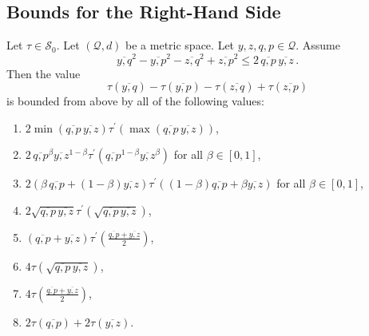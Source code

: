\documentclass{article}
\newcommand{\lb}{\left(} %
\newcommand{\rb}{\right)} %
\newcommand{\br}[1]{\lb #1 \rb} %
\newcommand{\brOf}[1]{\!\br{#1}} %
\newcommand*{\mc}[1]{\mathcal{#1}}
\newcommand{\pr}{^\prime}
\newcommand{\equationFullstop}{\, .}
\newcommand{\eqfs}{\equationFullstop}
\newcommand{\ol}[2]{\overline{#1,#2}}
\newcommand{\tran}{\tau}
\newcommand{\dtran}{\tran\pr}
\newcommand{\setcco}{\mc S_0}
\begin{document}
\subsection{Bounds for the Right-Hand Side}
%
\begin{corollary}\label{cor:rhsbound}
	Let $\tran\in\setcco$. Let $(\mc Q, d)$ be a metric space. Let $y,z,q,p\in\mc Q$. Assume
	\begin{equation}
		\ol yq^2 - \ol yp^2 - \ol zq^2 + \ol zp^2 \leq 2\, \ol qp \, \ol yz
		\eqfs
	\end{equation}
	Then the value 
	\begin{equation}
		\tran(\ol yq) - \tran(\ol yp) - \tran(\ol zq) + \tran(\ol zp)
	\end{equation}
	is bounded from above by all of the following values:
	\begin{enumerate}[label=(\roman*)]
		\item\label{cor:rhsbound:min} $2 \min(\ol qp\, \ol yz) \dtran\brOf{\max(\ol qp\, \ol yz)}$,
		\item\label{cor:rhsbound:geo} $2 \,\ol qp^\beta \ol yz^{1-\beta} \dtran\brOf{\ol qp^{1-\beta} \ol yz^\beta}$ for all $\beta\in[0,1]$,
		\item\label{cor:rhsbound:ari} $2 \br{\beta\,\ol qp + (1-\beta)\ol yz} \dtran\brOf{(1-\beta)\ol qp + \beta\ol yz}$ for all $\beta\in[0,1]$,
		\item\label{cor:rhsbound:sqrt} $2 \sqrt{\ol qp\, \ol yz} \dtran\brOf{\sqrt{\ol qp\, \ol yz}}$,
		\item\label{cor:rhsbound:avg} $\br{\ol qp + \ol yz} \dtran\brOf{\frac{\ol qp + \ol yz}2}$,
		\item\label{cor:rhsbound:tran} $4\tran\brOf{\sqrt{\ol qp\, \ol yz}}$,
		\item\label{cor:rhsbound:sum} $4\tran\brOf{\frac{\ol qp + \ol yz}2}$,
		\item\label{cor:rhsbound:transum} $2\tran(\ol qp) + 2\tran(\ol yz)$.
	\end{enumerate}
\end{corollary}
%
\end{document}
